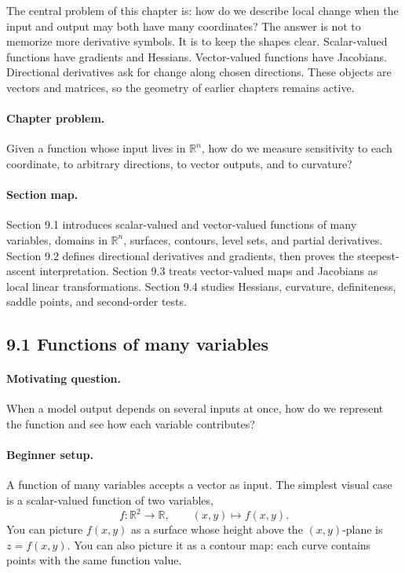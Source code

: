 The central problem of this chapter is: how do we describe local change when the input and output may both have many coordinates? The answer is not to memorize more derivative symbols. It is to keep the shapes clear. Scalar-valued functions have gradients and Hessians. Vector-valued functions have Jacobians. Directional derivatives ask for change along chosen directions. These objects are vectors and matrices, so the geometry of earlier chapters remains active.

\paragraph{Chapter problem.}
Given a function whose input lives in \(\mathbb{R}^n\), how do we measure sensitivity to each coordinate, to arbitrary directions, to vector outputs, and to curvature?

\paragraph{Section map.}
Section 9.1 introduces scalar-valued and vector-valued functions of many variables, domains in \(\mathbb{R}^n\), surfaces, contours, level sets, and partial derivatives. Section 9.2 defines directional derivatives and gradients, then proves the steepest-ascent interpretation. Section 9.3 treats vector-valued maps and Jacobians as local linear transformations. Section 9.4 studies Hessians, curvature, definiteness, saddle points, and second-order tests.

\subsection{9.1 Functions of many variables}

\paragraph{Motivating question.}
When a model output depends on several inputs at once, how do we represent the function and see how each variable contributes?

\paragraph{Beginner setup.}
A function of many variables accepts a vector as input. The simplest visual case is a scalar-valued function of two variables,
\[
f:\mathbb{R}^2\to\mathbb{R},
\qquad
(x,y)\mapsto f(x,y).
\]
You can picture \(f(x,y)\) as a surface whose height above the \((x,y)\)-plane is \(z=f(x,y)\). You can also picture it as a contour map: each curve contains points with the same function value.


